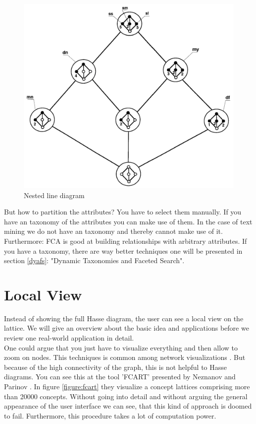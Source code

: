 \documentclass[11pt]{report}
\begin{document}
\begin{figure}[!ht]
	\centering
	\includegraphics[width=0.5\linewidth]{./images/nested}
\caption{Nested line diagram}
\label{figure:nested}
\end{figure}
	
But how to partition the attributes? You have to select them manually. If you have an taxonomy of the attributes you can make use of them. In the case of text mining we do not have an taxonomy and thereby cannot make use of it. Furthermore: FCA is good at building relationships with arbitrary attributes. If you have a taxonomy, there are way better techniques one will be presented in section \ref{dyafs}: "Dynamic Taxonomies and Faceted Search". \\

\section{Local View}
\label{Local View}

Instead of showing the full Hasse diagram, the user can see a local view on the lattice. We will give an overview about the basic idea and applications before we review one real-world application in detail. \\

One could argue that you just have to visualize everything and then allow to zoom on nodes. This techniques is common among network visualizations \cite{Herman2000}. But because of the high connectivity of the graph, this is not helpful to Hasse diagrams. You can see this at the tool 'FCART' presented by Neznanov and Parinov \cite{Neznanov2014}. In figure \ref{figure:fcart} they visualize a concept lattices comprising more than 20000 concepts. Without going into detail and without arguing the general appearance of the user interface we can see, that this kind of approach is doomed to fail. Furthermore, this procedure takes a lot of computation power. \\
\end{document}

